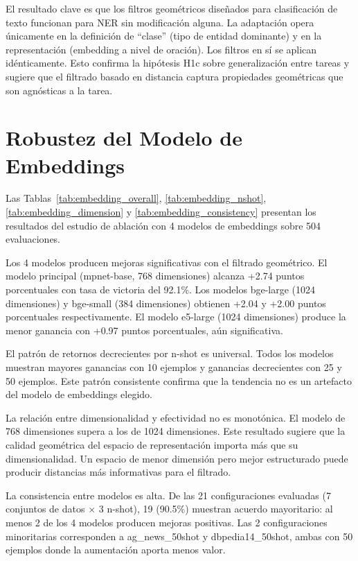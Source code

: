 El resultado clave es que los filtros geométricos diseñados para clasificación de texto funcionan para NER sin modificación alguna. La adaptación opera únicamente en la definición de ``clase'' (tipo de entidad dominante) y en la representación (embedding a nivel de oración). Los filtros en sí se aplican idénticamente. Esto confirma la hipótesis H1c sobre generalización entre tareas y sugiere que el filtrado basado en distancia captura propiedades geométricas que son agnósticas a la tarea.

\section{Robustez del Modelo de Embeddings}
\label{sec:robustez_embeddings}

Las Tablas~\ref{tab:embedding_overall}, \ref{tab:embedding_nshot}, \ref{tab:embedding_dimension} y \ref{tab:embedding_consistency} presentan los resultados del estudio de ablación con 4 modelos de embeddings sobre 504 evaluaciones.



Los 4 modelos producen mejoras significativas con el filtrado geométrico. El modelo principal (mpnet-base, 768 dimensiones) alcanza +2.74 puntos porcentuales con tasa de victoria del 92.1\%. Los modelos bge-large (1024 dimensiones) y bge-small (384 dimensiones) obtienen +2.04 y +2.00 puntos porcentuales respectivamente. El modelo e5-large (1024 dimensiones) produce la menor ganancia con +0.97 puntos porcentuales, aún significativa.



El patrón de retornos decrecientes por n-shot es universal. Todos los modelos muestran mayores ganancias con 10 ejemplos y ganancias decrecientes con 25 y 50 ejemplos. Este patrón consistente confirma que la tendencia no es un artefacto del modelo de embeddings elegido.



La relación entre dimensionalidad y efectividad no es monotónica. El modelo de 768 dimensiones supera a los de 1024 dimensiones. Este resultado sugiere que la calidad geométrica del espacio de representación importa más que su dimensionalidad. Un espacio de menor dimensión pero mejor estructurado puede producir distancias más informativas para el filtrado.



La consistencia entre modelos es alta. De las 21 configuraciones evaluadas (7 conjuntos de datos $\times$ 3 n-shot), 19 (90.5\%) muestran acuerdo mayoritario: al menos 2 de los 4 modelos producen mejoras positivas. Las 2 configuraciones minoritarias corresponden a ag\_news\_50shot y dbpedia14\_50shot, ambas con 50 ejemplos donde la aumentación aporta menos valor.

